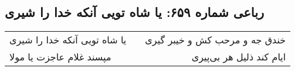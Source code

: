 \begin{center}
\section*{رباعی شماره ۶۵۹: یا شاه تویی آنکه خدا را شیری}
\label{sec:sh659}
\begin{longtable}{l p{0.5cm} r}
یا شاه تویی آنکه خدا را شیری
&&
خندق جه و مرحب کش و خیبر گیری
\\
مپسند غلام عاجزت یا مولا
&&
ایام کند ذلیل هر بی‌پیری
\\
\end{longtable}
\end{center}
